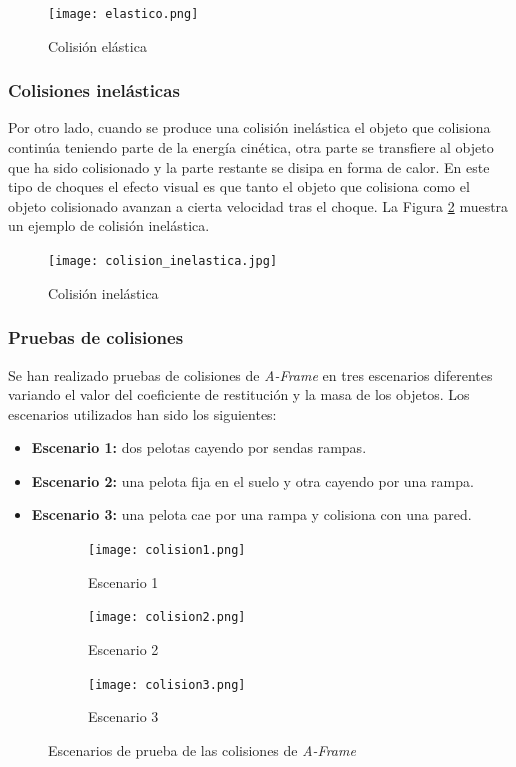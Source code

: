 \begin{figure}[h!]
    \centering
    \texttt{[image: elastico.png]}
    \caption[Colisión elástica]{Colisión elástica\footnotemark}
    \label{fig:elastico}
\end{figure}


\subsubsection{Colisiones inelásticas}
Por otro lado, cuando se produce una colisión inelástica el objeto que colisiona continúa teniendo parte de la energía cinética, otra parte se transfiere al objeto que ha sido colisionado y la parte restante se disipa en forma de calor. En este tipo de choques el efecto visual es que tanto el objeto que colisiona como el objeto colisionado avanzan a cierta velocidad tras el choque. La Figura \ref{fig:inelastico} muestra un ejemplo de colisión inelástica.

\begin{figure}[h!]
    \centering
    \texttt{[image: colision\_inelastica.jpg]}
    \caption[Colisión inelástica]{Colisión inelástica\footnotemark}
    \label{fig:inelastico}
\end{figure}

\subsubsection{Pruebas de colisiones}
Se han realizado pruebas de colisiones de \textit{A-Frame} en tres escenarios diferentes variando el valor del coeficiente de restitución y la masa de los objetos. Los escenarios utilizados han sido los siguientes:

\begin{itemize}
    \item \textbf{Escenario 1:} dos pelotas cayendo por sendas rampas.
    \item \textbf{Escenario 2:} una pelota fija en el suelo y otra cayendo por una rampa.
    \item \textbf{Escenario 3:} una pelota cae por una rampa y colisiona con una pared.
\end{itemize}

\begin{figure}[!h]
  \begin{subfigure}[b]{0.3\textwidth}
    \texttt{[image: colision1.png]}
    \caption{Escenario 1}
  \end{subfigure}
  \hfill
  \begin{subfigure}[b]{0.3\textwidth}
    \texttt{[image: colision2.png]}
    \caption{Escenario 2}
  \end{subfigure}
    \hfill
  \begin{subfigure}[b]{0.3\textwidth}
    \texttt{[image: colision3.png]}
    \caption{Escenario 3}
  \end{subfigure}
  \caption{Escenarios de prueba de las colisiones de \textit{A-Frame}}
 \end{figure}

